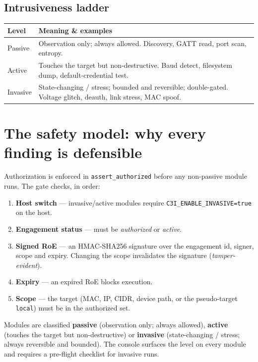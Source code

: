 \documentclass[11pt]{article}
\newif\ifintable\intablefalse
\newcommand{\code}[1]{\ifintable\texttt{#1}\else{\small\colorbox{codebg}{\texttt{#1}}}\fi}
\begin{document}
\subsection{Intrusiveness ladder}
\begin{table}[h]
\centering\footnotesize\intabletrue
\begin{tabularx}{\textwidth}{@{}L{2.4cm} X@{}}
\toprule
\textbf{Level} & \textbf{Meaning \& examples}\\
\midrule
Passive & Observation only; always allowed. Discovery, GATT read, port scan, entropy.\\
Active & Touches the target but non-destructive. Baud detect, filesystem dump, default-credential test.\\
Invasive & State-changing / stress; bounded and reversible; double-gated. Voltage glitch, deauth, link stress, MAC spoof.\\
\bottomrule
\end{tabularx}
\end{table}

\section{The safety model: why every finding is defensible}
Authorization is enforced in \code{assert\_authorized} before any non-passive
module runs. The gate checks, in order:
\begin{enumerate}
  \item \textbf{Host switch} --- invasive/active modules require
  \code{C3I\_ENABLE\_INVASIVE=true} on the host.
  \item \textbf{Engagement status} --- must be \emph{authorized} or \emph{active}.
  \item \textbf{Signed RoE} --- an HMAC-SHA256 signature over the engagement id,
  signer, scope and expiry. Changing the scope invalidates the signature
  (\emph{tamper-evident}).
  \item \textbf{Expiry} --- an expired RoE blocks execution.
  \item \textbf{Scope} --- the target (MAC, IP, CIDR, device path, or the
  pseudo-target \code{local}) must be in the authorized set.
\end{enumerate}

Modules are classified \textbf{passive} (observation only; always allowed),
\textbf{active} (touches the target but non-destructive) or \textbf{invasive}
(state-changing / stress; always reversible and bounded). The console surfaces
the level on every module and requires a pre-flight checklist for invasive runs.
\end{document}
